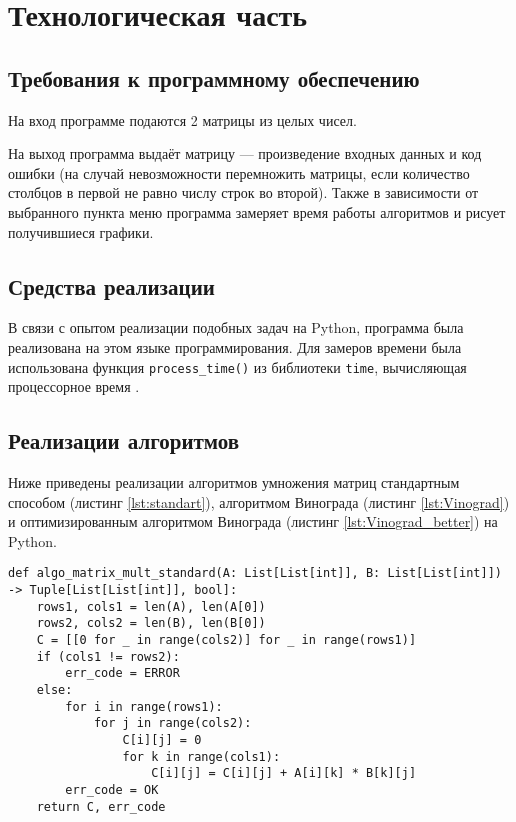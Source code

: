 \section{Технологическая часть}
\subsection{Требования к программному обеспечению}

\hspace{1.15cm}
На вход программе подаются 2 матрицы из целых чисел.

На выход программа выдаёт матрицу --- произведение входных данных и код ошибки (на случай невозможности перемножить матрицы, если количество столбцов в первой не равно числу строк во второй). Также в зависимости от выбранного пункта меню программа замеряет время работы алгоритмов и рисует получившиеся графики.

\subsection{Средства реализации}

\hspace{1.25cm}
В связи с опытом реализации подобных задач на Python, программа была реализована на этом языке программирования. Для замеров времени была использована функция \texttt{process\_time()} из библиотеки \texttt{time}, вычисляющая процессорное время \cite{process_time}.

\subsection{Реализации алгоритмов}

\hspace{1.25cm}
Ниже приведены реализации алгоритмов умножения матриц стандартным способом (листинг \ref{lst:standart}), алгоритмом Винограда (листинг \ref{lst:Vinograd}) и оптимизированным алгоритмом Винограда (листинг \ref{lst:Vinograd_better}) на Python.

\vspace{0.25cm}
\begin{lstlisting}[caption=реализация стандартного алгоритма умножения матриц, label=lst:standart]
def algo_matrix_mult_standard(A: List[List[int]], B: List[List[int]]) -> Tuple[List[List[int]], bool]:
    rows1, cols1 = len(A), len(A[0])
    rows2, cols2 = len(B), len(B[0])
    C = [[0 for _ in range(cols2)] for _ in range(rows1)]
    if (cols1 != rows2):
        err_code = ERROR
    else:
        for i in range(rows1):
            for j in range(cols2):
                C[i][j] = 0
                for k in range(cols1):
                    C[i][j] = C[i][j] + A[i][k] * B[k][j]
        err_code = OK
    return C, err_code
\end{lstlisting}

